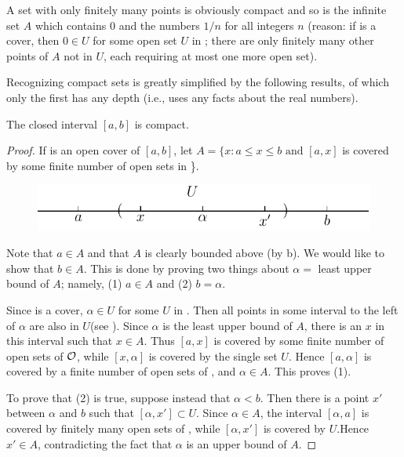 A set with only finitely many points is obviously compact
and so is the infinite set $A$ which contains 0 and the numbers
$1/n$ for all integers $n$ (reason: if  is a cover, then $0 \in U$ for
some open set $U$ in ; there are only finitely many other points
of $A$ not in $U$, each requiring at most one more open set).

Recognizing compact sets is greatly simplified by the following 
results, of which only the first has any depth (i.e., uses any
facts about the real numbers).

\begin{theorem}
  The closed interval $[a,b]$ is compact.
\end{theorem}

\begin{proof}
    If  is an open cover of $[a,b]$, let 
    $A = \{x:a\le x\le b\text{ and } [a, x]$ is covered by some finite number of open sets in \}.
    \begin{figure}[!htb]
        \centering
        \includegraphics[width=.75\linewidth]{./pics/Fig1-3.pdf}
        \caption{}
        \label{Fig 1-3}
    \end{figure}

    Note that $a\in A$ and that $A$ is clearly bounded above (by b).
    We would like to show that $b\in A$. This is done by proving two things about $\alpha =$ least 
    upper bound of $A$; namely, (1) $a\in A$ and (2) $b=\alpha$.

    Since  is a cover, $\alpha \in U$ for some $U$ in . Then all points in some interval 
    to the left of $\alpha$ are also in $U$(see ). Since $\alpha$ is the least upper bound 
    of $A$, there is an $x$ in this interval such that $x\in A$. Thus $[a, x]$ is covered by some 
    finite number of open sets of $\mathcal{O}$, while $[x, \alpha]$ is covered by the single set $U$. 
    Hence $[a, \alpha]$ is covered by a finite number of open sets of , and $\alpha \in A$.
    This proves (1).

    To prove that (2) is true, suppose instead that $\alpha < b$.
    Then there is a point $x'$ between $\alpha$ and $b$ such that $[\alpha,x'] \subset U$.
    Since $\alpha\in A$, the interval $[\alpha,a]$ is covered by finitely many
    open sets of , while $[\alpha, x']$ is covered by $U$.Hence $x' \in A$,
    contradicting the fact that $\alpha$ is an upper bound of $A$.
\end{proof}

